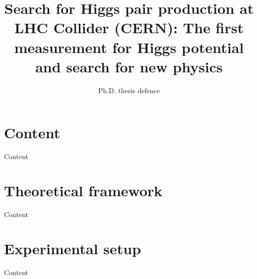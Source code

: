 \documentclass[10pt]{beamer}
\title{\textcolor{HHwhite}{Search for Higgs pair production at LHC Collider (CERN): The first measurement for Higgs potential and search for new physics}}
\subtitle{\textcolor{HHwhite}{Ph.D. thesis defence}}
\author{ 
\textcolor{HHwhite}{
{\textbf{Mohamed BELFKIR}} \\
{\and} \\
{\textit{Supervised by}} \\
{\textsf{Stephane JEZEQUEL}}
}
}
\date{}
\begin{document}
{
\begin{frame}
\titlepage
\end{frame}
}

\section*{Content}
\begin{frame}{Content}
\label{content}
    \tableofcontents
\end{frame}

\section{Theoretical framework}
\begin{frame}{Content}
\label{content}
    \tableofcontents[currentsection]
\end{frame}



\section{Experimental setup}

\begin{frame}{Content}
\label{content}
    \tableofcontents[currentsection]
\end{frame}
\end{document}
